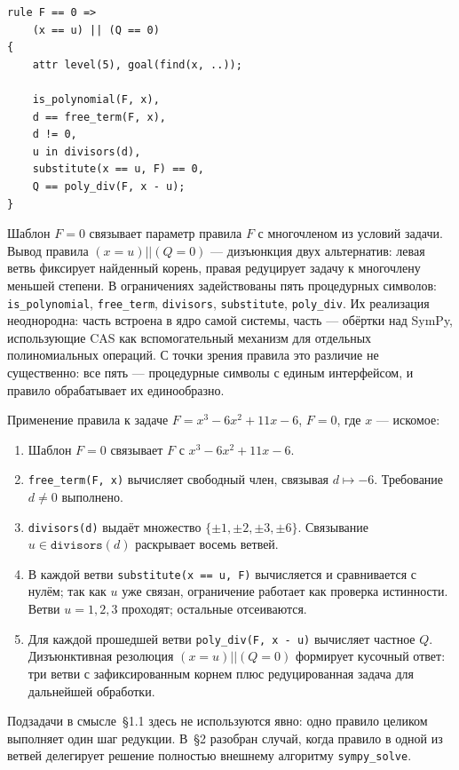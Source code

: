 \documentclass{intsys}
\begin{document}
\begin{lstlisting}
rule F == 0 =>
    (x == u) || (Q == 0)
{
    attr level(5), goal(find(x, ..));

    is_polynomial(F, x),
    d == free_term(F, x),
    d != 0,
    u in divisors(d),
    substitute(x == u, F) == 0,
    Q == poly_div(F, x - u);
}
\end{lstlisting}

Шаблон $F = 0$ связывает параметр правила $F$ с многочленом из
условий задачи. Вывод правила $(x = u) \mathrel{||} (Q = 0)$ ---
дизъюнкция двух альтернатив: левая ветвь фиксирует найденный
корень, правая редуцирует задачу к многочлену меньшей степени. В
ограничениях задействованы пять
процедурных символов: \texttt{is\_polynomial}, \texttt{free\_term},
\texttt{divisors}, \texttt{substitute}, \texttt{poly\_div}. Их
реализация неоднородна: часть встроена в ядро самой системы, часть
--- обёртки над SymPy, использующие CAS как вспомогательный механизм
для отдельных полиномиальных операций. С точки зрения правила это
различие не существенно: все пять --- процедурные символы с единым
интерфейсом, и правило обрабатывает их единообразно.

Применение правила к задаче $F = x^3 - 6x^2 + 11x - 6$, $F = 0$, где
$x$ --- искомое:

\begin{enumerate}
  \item Шаблон $F = 0$ связывает $F$ с $x^3 - 6x^2 + 11x - 6$.
  \item \texttt{free\_term(F, x)} вычисляет свободный член,
    связывая $d \mapsto -6$. Требование $d \neq 0$ выполнено.
  \item \texttt{divisors(d)} выдаёт множество
    $\{\pm 1, \pm 2, \pm 3, \pm 6\}$. Связывание $u \in
    \texttt{divisors}(d)$ раскрывает восемь ветвей.
  \item В каждой ветви \texttt{substitute(x == u, F)} вычисляется и
    сравнивается с нулём; так как $u$ уже связан, ограничение
    работает как проверка истинности. Ветви $u = 1, 2, 3$ проходят;
    остальные отсеиваются.
  \item Для каждой прошедшей ветви \texttt{poly\_div(F, x - u)}
    вычисляет частное $Q$. Дизъюнктивная резолюция
    $(x = u) \mathrel{||} (Q = 0)$ формирует кусочный ответ:
    три ветви с зафиксированным корнем плюс редуцированная задача
    для дальнейшей обработки.
\end{enumerate}

Подзадачи в смысле~\S1.1 здесь не используются явно: одно правило
целиком выполняет один шаг редукции. В~\S2 разобран случай, когда
правило в одной из ветвей делегирует решение полностью внешнему
алгоритму \texttt{sympy\_solve}.
\end{document}
